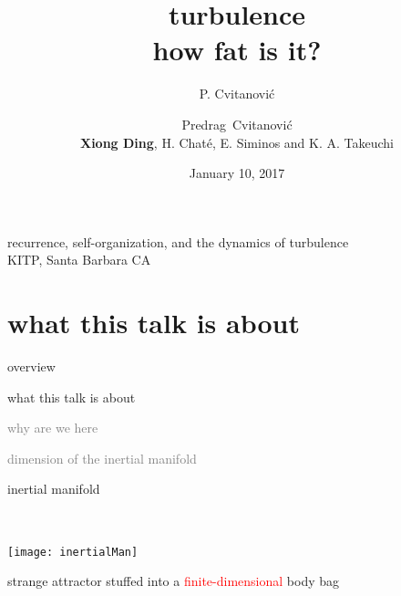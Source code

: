 




\title{\Large turbulence\\
\huge how {\Huge fat} is it?}
\author{P. Cvitanovi\'c}
\author[Cvitanovi\'c]
{
  \textcolor{green!50!black}{
  {Predrag~Cvitanovi\'c \\
  {\bf Xiong Ding}, H. Chat\'e, E. Siminos and K. A. Takeuchi
  }	%
  }
}
\institute
{
recurrence, self-organization, and the dynamics of turbulence
\\
KITP, Santa Barbara CA
 }
\date{January 10, 2017}



\begin{frame}
  \titlepage
\end{frame}


\section[what this talk is about]
 {what this talk is about}

\begin{frame}{overview}
\begin{enumerate}
              \item {\Large
what this talk is about
                  }\textcolor{gray}{\small
              \item
why are we here
              \item
\statesp
              \item
dimension of the inertial manifold
                    }
            \end{enumerate}
\end{frame}


\begin{frame}{}
    \begin{minipage}[b]{0.30\textwidth}
\begin{block}{inertial
 manifold
}
\end{block}
    \end{minipage}
~~~~~~
    \begin{minipage}[b]{0.60\textwidth}
\begin{center}
\texttt{[image: inertialMan]}
\end{center}
    \end{minipage}

\medskip
strange attractor stuffed into
a \textcolor{red}{\Large finite-dimensional} body bag
\end{frame}

